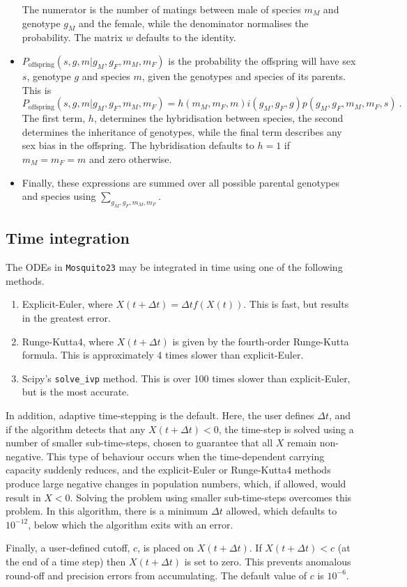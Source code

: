 \documentclass[11pt,a4paper]{article}
\begin{document}
\begin{itemize}
The numerator is the number of matings between male of species $m_{M}$ and genotype $g_{M}$ and the female, while the denominator normalises the probability.  The matrix $w$ defaults to the identity.
\item $P_{\mathrm{offspring}}(s, g, m | g_{M}, g_{F}, m_{M}, m_{F})$ is the probability the offspring will have sex $s$, genotype $g$ and species $m$, given the genotypes and species of its parents.  This is
\begin{equation}
P_{\mathrm{offspring}}(s, g, m | g_{M}, g_{F}, m_{M}, m_{F}) = h(m_{M}, m_{F}, m)i(g_{M}, g_{F}, g)p(g_{M}, g_{F}, m_{M}, m_{F}, s) \ .
\end{equation}
The first term, $h$, determines the hybridisation between species, the second determines the inheritance of genotypes, while the final term describes any sex bias in the offspring.  The hybridisation defaults to $h=1$ if $m_{M}=m_{F}=m$ and zero otherwise.  
\item Finally, these expressions are summed over all possible parental genotypes and species using $\sum_{g_{M}, g_{F}, m_{M}, m_{F}}$.
\end{itemize}

\subsection{Time integration}

The ODEs in {\tt Mosquito23} may be integrated in time using one of the following methods.
\begin{enumerate}
\item Explicit-Euler, where $X(t + \Delta t) = \Delta t f(X(t))$.  This is fast, but results in the greatest error.
\item Runge-Kutta4, where $X(t + \Delta t)$ is given by the fourth-order Runge-Kutta formula.  This is approximately 4 times slower than explicit-Euler.
\item Scipy's {\tt solve\_ivp} method.  This is over 100 times slower than explicit-Euler, but is the most accurate.
\end{enumerate}

In addition, adaptive time-stepping is the default.  Here, the user defines $\Delta t$, and if the algorithm detects that any $X(t + \Delta t) < 0$, the time-step is solved using a number of smaller sub-time-steps, chosen to guarantee that all $X$ remain non-negative.  This type of behaviour occurs when the time-dependent carrying capacity suddenly reduces, and the explicit-Euler or Runge-Kutta4 methods produce large negative changes in population numbers, which, if allowed, would result in $X<0$.  Solving the problem using smaller sub-time-steps overcomes this problem.  In this algorithm, there is a minimum $\Delta t$ allowed, which defaults to $10^{-12}$, below which the algorithm exits with an error.

Finally, a user-defined cutoff, $c$, is placed on $X(t + \Delta t)$.  If $X(t + \Delta t) < c$ (at the end of a time step) then $X(t + \Delta t)$ is set to zero.  This prevents anomalous round-off and precision errors from accumulating.  The default value of $c$ is $10^{-6}$.
\end{document}
